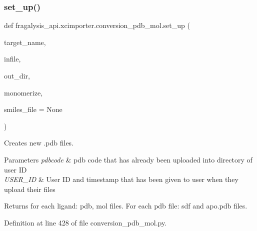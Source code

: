 \subsubsection{\texorpdfstring{set\+\_\+up()}{set\_up()}}
{\footnotesize\ttfamily def fragalysis\+\_\+api.\+xcimporter.\+conversion\+\_\+pdb\+\_\+mol.\+set\+\_\+up (\begin{DoxyParamCaption}\item[{}]{target\+\_\+name,  }\item[{}]{infile,  }\item[{}]{out\+\_\+dir,  }\item[{}]{monomerize,  }\item[{}]{smiles\+\_\+file = {\ttfamily None} }\end{DoxyParamCaption})}



Creates new .pdb files. 


\begin{DoxyParams}{Parameters}
{\em pdbcode} & pdb code that has already been uploaded into directory of user ID \\
\hline
{\em U\+S\+E\+R\+\_\+\+ID} & User ID and timestamp that has been given to user when they upload their files \\
\hline
\end{DoxyParams}
\begin{DoxyReturn}{Returns}
for each ligand\+: pdb, mol files. For each pdb file\+: sdf and apo.\+pdb files. 
\end{DoxyReturn}


Definition at line 428 of file conversion\+\_\+pdb\+\_\+mol.\+py.


